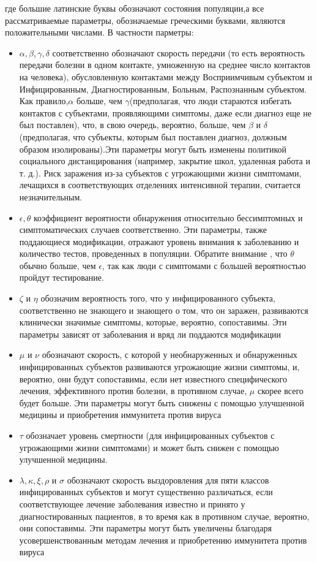 где большие латинские буквы обозначают состояния популяции,а все рассматриваемые параметры, обозначаемые греческими буквами, являются положительными числами. В частности парметры:
\begin{itemize}
\item $\alpha, \beta, \gamma, \delta$ соответственно обозначают скорость передачи (то есть вероятность передачи болезни в одном контакте, умноженную на среднее число контактов на человека), обусловленную контактами между Восприимчивым субъектом и Инфицированным, Диагностированным, Больным, Распознанным субъектом. Как правило,$\alpha$ больше, чем $\gamma$(предполагая, что люди стараются избегать контактов с субъектами, проявляющими симптомы, даже если диагноз еще не был поставлен), что, в свою очередь, вероятно, больше, чем $\beta$ и $\delta$ (предполагая, что субъекты, которым был поставлен диагноз, должным образом изолированы).Эти параметры могут быть изменены политикой социального дистанцирования (например, закрытие школ, удаленная работа и т. д.). Риск заражения из-за субъектов с угрожающими жизни симптомами, лечащихся в соответствующих отделениях интенсивной терапии, считается незначительным.
\item $\epsilon, \theta$ коэффициент вероятности обнаружения относительно бессимптомных и симптоматических случаев соответственно. Эти параметры, также поддающиеся модификации, отражают уровень внимания к заболеванию и количество тестов, проведенных в популяции. Обратите внимание , что $\theta$ обычно больше, чем $\epsilon$, так как люди с симптомами с большей вероятностью пройдут тестирование.
\item $\zeta$ и $\eta$ обозначим вероятность того, что у инфицированного субъекта, соответственно не знающего и знающего о том, что он заражен, развиваются клинически значимые симптомы, которые, вероятно, сопоставимы. Эти параметры зависят от заболевания и вряд ли поддаются модификации
\item $\mu$ и $\nu$ обозначают скорость, с которой у необнаруженных и обнаруженных инфицированных субъектов развиваются угрожающие жизни симптомы, и, вероятно, они будут сопоставимы, если нет известного специфического лечения, эффективного против болезни, в противном случае, $\mu$ скорее всего будет больше. Эти параметры могут быть снижены с помощью улучшенной медицины и приобретения иммунитета против вируса
\item $\tau$ обозначает уровень смертности (для инфицированных субъектов с угрожающими жизни симптомами) и может быть снижен с помощью улучшенной медицины.
\item $\lambda, \kappa, \xi, \rho$ и $\sigma$ обозначают скорость выздоровления для пяти классов инфицированных субъектов и могут существенно различаться, если соответствующее лечение заболевания известно и принято у диагностированных пациентов, в то время как в противном случае, вероятно, они сопоставимы. Эти параметры могут быть увеличены благодаря усовершенствованным методам лечения и приобретению иммунитета против вируса
\end{itemize}
